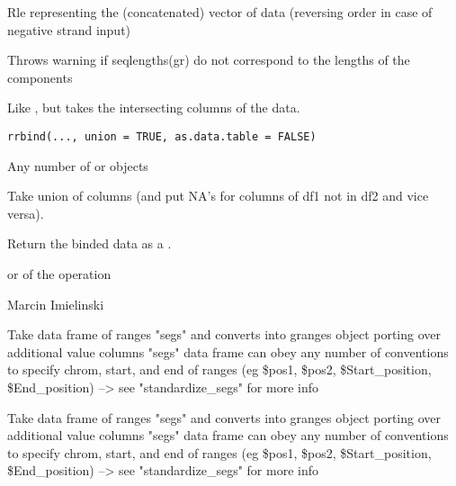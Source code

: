 \documentclass[a4paper]{book}
\begin{document}
%
\begin{Value}
Rle representing the (concatenated) vector of data (reversing order in case of negative strand input)
\end{Value}
%
\begin{Note}\relax
Throws warning if seqlengths(gr) do not correspond to the lengths of the  components
\end{Note}
%
\begin{Description}\relax
Like , but takes the intersecting columns of the data.
\end{Description}
%
\begin{Usage}
\begin{verbatim}
rrbind(..., union = TRUE, as.data.table = FALSE)
\end{verbatim}
\end{Usage}
%
\begin{Arguments}
\begin{ldescription}
\item[\code{...}] Any number of  or  objects

\item[\code{union}] Take union of columns (and put NA's for columns of df1 not in df2 and vice versa). \code{[TRUE]}

\item[\code{as.data.table}] Return the binded data as a . \code{[FALSE]}
\end{ldescription}
\end{Arguments}
%
\begin{Value}
 or  of the  operation
\end{Value}
%
\begin{Author}\relax
Marcin Imielinski
\end{Author}
%
\begin{Description}\relax
Take data frame of ranges "segs" and converts into granges object porting over additional value columns
"segs" data frame can obey any number of conventions to specify chrom, start, and end of ranges
(eg \$pos1, \$pos2, \$Start\_position, \$End\_position) --> see "standardize\_segs" for more info

Take data frame of ranges "segs" and converts into granges object porting over additional value columns
"segs" data frame can obey any number of conventions to specify chrom, start, and end of ranges
(eg \$pos1, \$pos2, \$Start\_position, \$End\_position) --> see "standardize\_segs" for more info
\end{Description}
\end{document}
